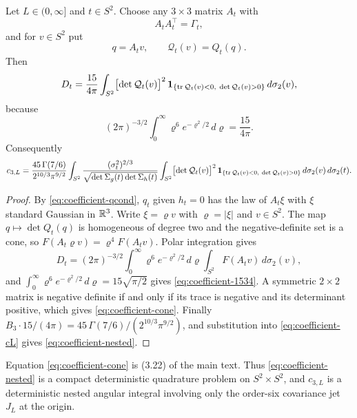 \begin{proposition}\label{prop:coefficient-cone}
Let $L\in(0,\infty]$ and $t\in S^2$. Choose any $3\times3$ matrix $A_t$ with
\begin{equation}\label{eq:coefficient-At}
A_tA_t^{\top}=\Gamma_t,
\end{equation}
and for $v\in S^2$ put
\begin{equation}\label{eq:coefficient-calQ}
q=A_tv,\qquad \mathcal Q_t(v)=Q_t(q).
\end{equation}
Then
\begin{equation}\label{eq:coefficient-cone}
D_t=\frac{15}{4\pi}\int_{S^2}\bigl[\det\mathcal Q_t(v)\bigr]^2\,\mathbf 1_{\{\operatorname{tr}\mathcal Q_t(v)<0,\ \det\mathcal Q_t(v)>0\}}\,d\sigma_2(v),
\end{equation}
because
\begin{equation}\label{eq:coefficient-1534}
(2\pi)^{-3/2}\int_0^\infty\varrho^6e^{-\varrho^2/2}\,d\varrho=\frac{15}{4\pi}.
\end{equation}
Consequently
\begin{equation}\label{eq:coefficient-nested}
c_{3,L}=\frac{45\,\Gamma(7/6)}{2^{10/3}\pi^{9/2}}\int_{S^2}\frac{(\sigma_t^2)^{2/3}}{\sqrt{\det\Sigma_g(t)\det\Sigma_h(t)}}
\int_{S^2}\bigl[\det\mathcal Q_t(v)\bigr]^2\,\mathbf 1_{\{\operatorname{tr}\mathcal Q_t(v)<0,\ \det\mathcal Q_t(v)>0\}}\,d\sigma_2(v)\,d\sigma_2(t).
\end{equation}
\end{proposition}

\begin{proof}
By \eqref{eq:coefficient-qcond}, $q_t$ given $h_t=0$ has the law of $A_t\xi$ with $\xi$ standard Gaussian in $\mathbb R^3$. Write $\xi=\varrho v$ with $\varrho=|\xi|$ and $v\in S^2$. The map $q\mapsto\det Q_t(q)$ is homogeneous of degree two and the negative-definite set is a cone, so $F(A_t\varrho v)=\varrho^4F(A_tv)$. Polar integration gives
\[
D_t=(2\pi)^{-3/2}\int_0^\infty\varrho^6e^{-\varrho^2/2}\,d\varrho\int_{S^2}F(A_tv)\,d\sigma_2(v),
\]
and $\int_0^\infty\varrho^6e^{-\varrho^2/2}\,d\varrho=15\sqrt{\pi/2}$ gives \eqref{eq:coefficient-1534}. A symmetric $2\times2$ matrix is negative definite if and only if its trace is negative and its determinant positive, which gives \eqref{eq:coefficient-cone}. Finally $B_3\cdot15/(4\pi)=45\,\Gamma(7/6)/(2^{10/3}\pi^{9/2})$, and substitution into \eqref{eq:coefficient-cL} gives \eqref{eq:coefficient-nested}.
\end{proof}

Equation \eqref{eq:coefficient-cone} is (3.22) of the main text. Thus \eqref{eq:coefficient-nested} is a compact deterministic quadrature problem on $S^2\times S^2$, and $c_{3,L}$ is a deterministic nested angular integral involving only the order-six covariance jet $J_L$ at the origin.

